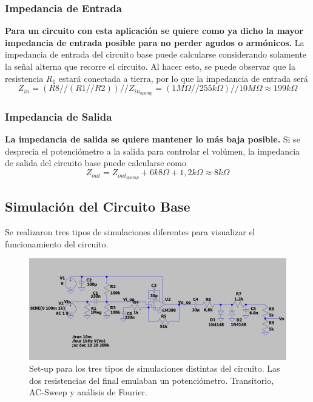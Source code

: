 \subsubsection{Impedancia de Entrada}

\textbf{Para un circuito con esta aplicación se quiere como ya dicho la mayor impedancia de entrada posible para no perder agudos o armónicos.}
La impedancia de entrada del circuito base puede calcularse considerando solamente la señal alterna que recorre el circuito. Al hacer esto, se puede observar que la resistencia $R_1$ estará conectada a tierra, por lo que la impedancia de entrada será
\[Z_{in} = (R8//(R1//R2))//Z_{in_{opamp}} = (1M\Omega // 255k\Omega)//10M\Omega \approx 199k\Omega\]

\subsubsection{Impedancia de Salida}

\textbf{La impedancia de salida se quiere mantener lo más baja posible.}
Si se desprecia el potenciómetro a la salida para controlar el volúmen, la impedancia de salida del circuito base puede calcularse como
\[ Z_{out} = Z_{out_{opamp}} + 6k8\Omega + 1,2k\Omega \approx 8k\Omega \]

\subsection{Simulación del Circuito Base}

Se realizaron tres tipos de simulaciones diferentes para visualizar el funcionamiento del circuito.

\begin{figure}[H]
	\centering
	\includegraphics[width=1\textwidth, trim={0 0 0 0}, clip]{Ejercicio5/Imagenes/Circuito_base/Sim/sim_base.JPG}
	\caption{Set-up para los tres tipos de simulaciones distintas del circuito. Las dos resistencias del final emulaban un potenciómetro. Transitorio, AC-Sweep y análisis de Fourier.}
	\label{fig:sim_base}
\end{figure}

